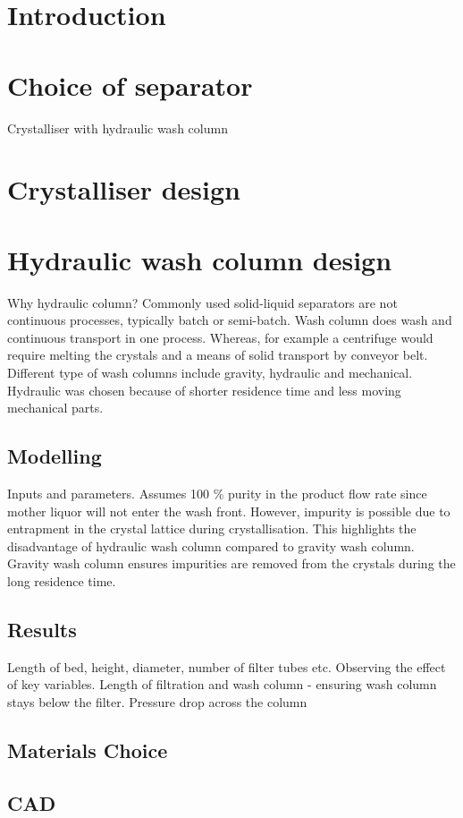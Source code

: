\section{Introduction}


\section{Choice of separator}
Crystalliser with hydraulic wash column 



\section{Crystalliser design}




\section{Hydraulic wash column design}
Why hydraulic column?
Commonly used solid-liquid separators are not continuous processes, typically batch or semi-batch. Wash column does wash and continuous transport in one process. Whereas, for example a centrifuge would require  melting the crystals and a means of solid transport by conveyor belt. Different type of wash columns include gravity, hydraulic and mechanical. Hydraulic was chosen because of shorter residence time and less moving mechanical parts. 

\subsection{Modelling}
Inputs and parameters. 
Assumes 100 \% purity in the product flow rate since mother liquor will not enter the wash front. However, impurity is possible due to entrapment in the crystal lattice during crystallisation. This highlights the disadvantage of hydraulic wash column compared to gravity wash column. Gravity wash column ensures impurities are removed from the crystals during the long residence time. 


\subsection{Results}
Length of bed, height, diameter, number of filter tubes etc. Observing the effect of key variables. Length of filtration and wash column - ensuring wash column stays below the filter. Pressure drop across the column

\subsection{Materials Choice}

\subsection{CAD}

